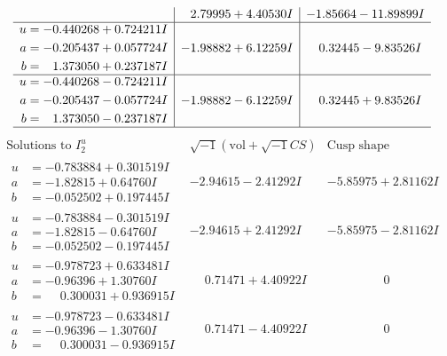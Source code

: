 \documentclass[1p]{elsarticle_modified}
\theoremstyle{definition}
\newcommand{\I}{\sqrt{-1}}
\begin{document}
$$\begin{array}{c|c|c}
 & \phantom{-}2.79995 + 4.40530 I & -1.85664 - 11.89899 I \\ \hline\begin{aligned}
u &= -0.440268 + 0.724211 I \\
a &= -0.205437 + 0.057724 I \\
b &= \phantom{-}1.373050 + 0.237187 I\end{aligned}
 & -1.98882 + 6.12259 I & \phantom{-}0.32445 - 9.83526 I \\ \hline\begin{aligned}
u &= -0.440268 - 0.724211 I \\
a &= -0.205437 - 0.057724 I \\
b &= \phantom{-}1.373050 - 0.237187 I\end{aligned}
 & -1.98882 - 6.12259 I & \phantom{-}0.32445 + 9.83526 I\\
 \hline 
 \end{array}$$\newpage$$\begin{array}{c|c|c}  
\text{Solutions to }I^u_{2}& \I (\text{vol} + \sqrt{-1}CS) & \text{Cusp shape}\\
 \hline 
\begin{aligned}
u &= -0.783884 + 0.301519 I \\
a &= -1.82815 + 0.64760 I \\
b &= -0.052502 + 0.197445 I\end{aligned}
 & -2.94615 - 2.41292 I & -5.85975 + 2.81162 I \\ \hline\begin{aligned}
u &= -0.783884 - 0.301519 I \\
a &= -1.82815 - 0.64760 I \\
b &= -0.052502 - 0.197445 I\end{aligned}
 & -2.94615 + 2.41292 I & -5.85975 - 2.81162 I \\ \hline\begin{aligned}
u &= -0.978723 + 0.633481 I \\
a &= -0.96396 + 1.30760 I \\
b &= \phantom{-}0.300031 + 0.936915 I\end{aligned}
 & \phantom{-}0.71471 + 4.40922 I & \phantom{-0.000000 } 0 \\ \hline\begin{aligned}
u &= -0.978723 - 0.633481 I \\
a &= -0.96396 - 1.30760 I \\
b &= \phantom{-}0.300031 - 0.936915 I\end{aligned}
 & \phantom{-}0.71471 - 4.40922 I & \phantom{-0.000000 } 0 \\ \hline\begin{aligned}

\end{aligned}
\end{array}$$
\end{document}
